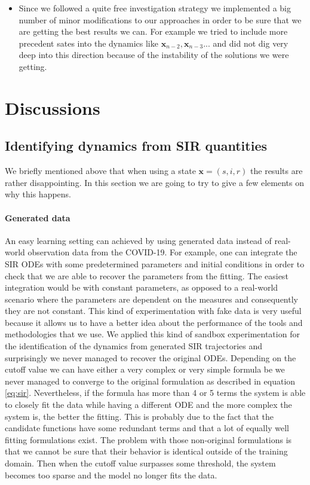 \documentclass[12pt, letterpaper]{article}
\begin{document}
\begin{itemize}
	\item Since we followed a quite free investigation strategy we implemented a big number of minor modifications to our approaches in order to be sure that we are getting the best results we can. 
	For example we tried to include more precedent sates into the dynamics like $\mathbf{x}_{n-2}, \mathbf{x}_{n-3}...$ and did not dig very deep into this direction because of the instability of the solutions we were getting.


\end{itemize}

\section{Discussions}\label{sec:discussions}

\subsection{Identifying dynamics from SIR quantities}\label{sec:sirfail}

We briefly mentioned above that when using a state $\mathbf{x} = (s, i, r)$ the results are rather disappointing. In this section we are going to try to give a few elements on why this happens. 

\paragraph{Generated data}

An easy learning setting can achieved by using generated data instead of real-world observation data from the COVID-19. 
For example, one can integrate the SIR ODEs with some predetermined parameters and initial conditions in order to check that we are able to recover the parameters from the fitting.
The easiest integration would be with constant parameters, as opposed to a real-world scenario where the parameters are dependent on the measures and consequently they are not constant.
This kind of experimentation with fake data is very useful because it allows us to have a better idea about the performance of the tools and methodologies that we use.
We applied this kind of sandbox experimentation for the identification of the dynamics from generated SIR trajectories and surprisingly we never managed to recover the original ODEs.
Depending on the cutoff value we can have either a very complex or very simple formula be we never managed to converge to the original formulation as described in equation \ref{eq:sir}. 
Nevertheless, if the formula has more than 4 or 5 terms the system is able to closely fit the data while having a different ODE and the more complex the system is, the better the fitting. 
This is probably due to the fact that the candidate functions have some redundant terms and that a lot of equally well fitting formulations exist.
The problem with those non-original formulations is that we cannot be sure that their behavior is identical outside of the training domain.
Then when the cutoff value surpasses some threshold, the system becomes too sparse and the model no longer fits the data.
\end{document}
